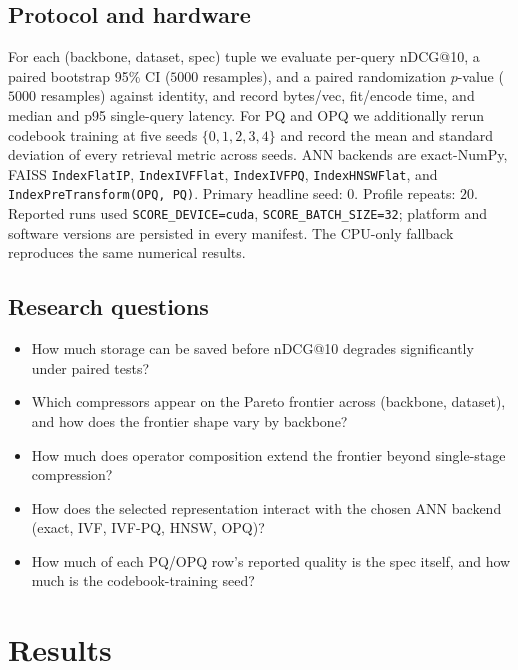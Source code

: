 \documentclass[sigconf]{acmart}
\makeatletter
\newcommand{\ndcg}{nDCG@10}
\makeatother
\begin{document}
\subsection{Protocol and hardware}
For each (backbone, dataset, spec) tuple we evaluate per-query \ndcg{}, a paired bootstrap 95\% CI ($5000$ resamples), and a paired randomization $p$-value ($5000$ resamples) against identity, and record bytes/vec, fit/encode time, and median and p95 single-query latency. For PQ and OPQ we additionally rerun codebook training at five seeds $\{0,1,2,3,4\}$ and record the mean and standard deviation of every retrieval metric across seeds. ANN backends are exact-NumPy, FAISS \texttt{IndexFlatIP}, \texttt{IndexIVFFlat}, \texttt{IndexIVFPQ}, \texttt{IndexHNSWFlat}, and \texttt{IndexPreTransform(OPQ,\,PQ)}. Primary headline seed: $0$. Profile repeats: $20$. Reported runs used \texttt{SCORE\_DEVICE=cuda}, \texttt{SCORE\_BATCH\_SIZE=32}; platform and software versions are persisted in every manifest. The CPU-only fallback reproduces the same numerical results.

\subsection{Research questions}
\begin{itemize}
  \item[\textbf{RQ1}] How much storage can be saved before \ndcg{} degrades significantly under paired tests?
  \item[\textbf{RQ2}] Which compressors appear on the Pareto frontier across (backbone, dataset), and how does the frontier shape vary by backbone?
  \item[\textbf{RQ3}] How much does operator composition extend the frontier beyond single-stage compression?
  \item[\textbf{RQ4}] How does the selected representation interact with the chosen ANN backend (exact, IVF, IVF-PQ, HNSW, OPQ)?
  \item[\textbf{RQ5}] How much of each PQ/OPQ row's reported quality is the spec itself, and how much is the codebook-training seed?
\end{itemize}

\section{Results}
\label{sec:results}
\end{document}
